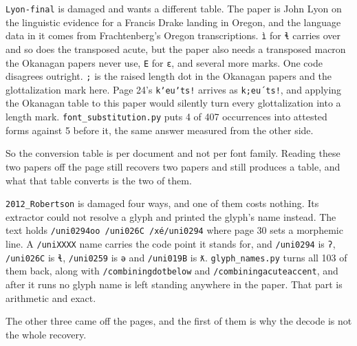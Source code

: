 \texttt{Lyon-\allowbreak{}final} is damaged and wants a different table. The paper is John Lyon on the linguistic evidence for a Francis Drake landing in Oregon, and the language data in it comes from Frachtenberg's Oregon transcriptions. \texttt{ì} for \texttt{ɬ} carries over and so does the transposed acute, but the paper also needs a transposed macron the Okanagan papers never use, \texttt{E} for \texttt{ɛ}, and several more marks. One code disagrees outright. \texttt{;} is the raised length dot in the Okanagan papers and the glottalization mark here. Page 24's \texttt{kʼeuʼts!} arrives as \texttt{k;eu´ts!}, and applying the Okanagan table to this paper would silently turn every glottalization into a length mark. \texttt{font\_\allowbreak{}substitution.\allowbreak{}py} puts 4 of 407 occurrences into attested forms against 5 before it, the same answer measured from the other side.

So the conversion table is per document and not per font family. Reading these two papers off the page still recovers two papers and still produces a table, and what that table converts is the two of them.

\texttt{2012\_\allowbreak{}Robertson} is damaged four ways, and one of them costs nothing. Its extractor could not resolve a glyph and printed the glyph's name instead. The text holds \texttt{/\allowbreak{}uni0294oo /\allowbreak{}uni026C /\allowbreak{}xé/\allowbreak{}uni0294} where page 30 sets a morphemic line. A \texttt{/\allowbreak{}uni\allowbreak{}XXXX} name carries the code point it stands for, and \texttt{/\allowbreak{}uni0294} is \texttt{ʔ}, \texttt{/\allowbreak{}uni026C} is \texttt{ɬ}, \texttt{/\allowbreak{}uni0259} is \texttt{ə} and \texttt{/\allowbreak{}uni019B} is \texttt{ƛ}. \texttt{glyph\_\allowbreak{}names.\allowbreak{}py} turns all 103 of them back, along with \texttt{/\allowbreak{}combiningdotbelow} and \texttt{/\allowbreak{}combiningacuteaccent}, and after it runs no glyph name is left standing anywhere in the paper. That part is arithmetic and exact.

The other three came off the pages, and the first of them is why the decode is not the whole recovery.

